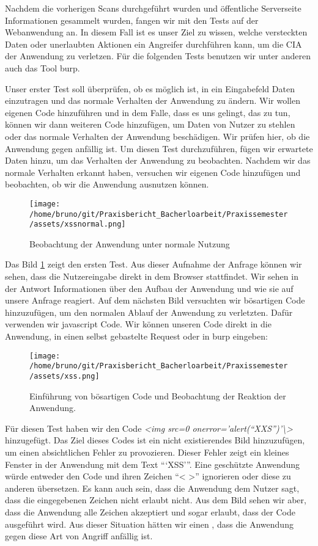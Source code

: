 Nachdem die vorherigen Scans durchgeführt wurden und öffentliche Serverseite Informationen gesammelt wurden, fangen wir mit den Tests auf der Webanwendung an. In diesem Fall ist es unser Ziel zu wissen, welche versteckten Daten oder unerlaubten Aktionen ein Angreifer durchführen kann, um die \gls{CIA} der Anwendung zu verletzen. Für die folgenden Tests benutzen wir unter anderen auch das Tool \gls{burp}.

Unser erster Test soll überprüfen, ob es möglich ist, in ein Eingabefeld Daten einzutragen und das normale Verhalten der Anwendung zu ändern. Wir wollen eigenen Code hinzuführen und in dem Falle, dass es uns gelingt, das zu tun, können wir dann weiteren Code hinzufügen, um Daten von Nutzer zu stehlen oder das normale Verhalten der Anwendung beschädigen. Wir prüfen hier, ob die Anwendung gegen  anfällig ist. Um diesen Test durchzuführen, fügen wir erwartete Daten hinzu, um das Verhalten der Anwendung zu beobachten. Nachdem wir das normale Verhalten erkannt haben, versuchen wir eigenen Code hinzufügen und beobachten, ob wir die Anwendung ausnutzen können. 

\begin{figure}[H]
    \centering
    \texttt{[image: /home/bruno/git/Praxisbericht\_Bacherloarbeit/Praxissemester/assets/xssnormal.png]}
    \caption{Beobachtung der Anwendung unter normale Nutzung}
    \label{fig:xssnormal}
    \centering
\end{figure}

Das Bild \ref{fig:xssnormal} zeigt den ersten Test. Aus dieser Aufnahme der Anfrage können wir sehen, dass die Nutzereingabe direkt in dem Browser stattfindet. Wir sehen in der Antwort Informationen über den Aufbau der Anwendung und wie sie auf unsere Anfrage reagiert. Auf dem nächsten Bild versuchten wir bösartigen Code hinzuzufügen, um den normalen Ablauf der Anwendung zu verletzten. Dafür verwenden wir \gls{javascript} Code. Wir können unseren Code direkt in die Anwendung, in einen selbst gebastelte Request oder in \gls{burp} eingeben:

\begin{figure}[H]
    \centering
    \texttt{[image: /home/bruno/git/Praxisbericht\_Bacherloarbeit/Praxissemester/assets/xss.png]}
    \caption{Einführung von bösartigen Code und Beobachtung der Reaktion der Anwendung.}
    \label{fig:xssexecuted}
    \centering
\end{figure}

Für diesen Test haben wir den Code \textit{<img src=0 onerror='alert(``XXS'')'\textbackslash>} hinzugefügt. Das Ziel dieses Codes ist ein nicht existierendes Bild hinzuzufügen, um einen absichtlichen Fehler zu provozieren. Dieser Fehler zeigt ein kleines Fenster in der Anwendung mit dem Text ```XSS'''. Eine geschützte Anwendung würde entweder den Code und ihren Zeichen ``< >'' ignorieren oder diese zu anderen übersetzen. Es kann auch sein, dass die Anwendung dem Nutzer sagt, dass die eingegebenen Zeichen nicht erlaubt nicht. Aus dem Bild sehen wir aber, dass die Anwendung alle Zeichen akzeptiert und sogar erlaubt, dass der Code ausgeführt wird. Aus dieser Situation hätten wir einen , dass die Anwendung gegen diese Art von Angriff anfällig ist.


